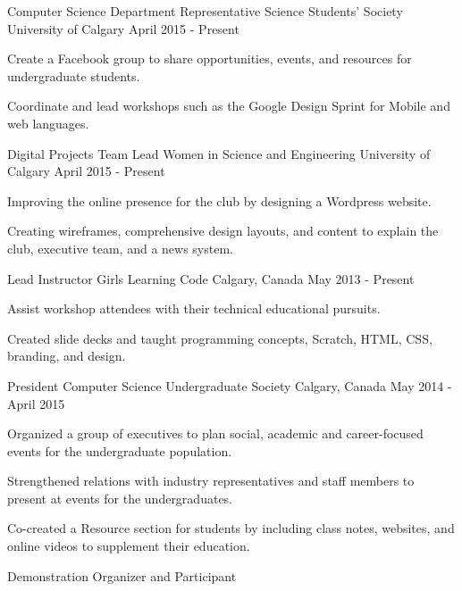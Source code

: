 \begin{cventries}
  \cventry
    {Computer Science Department Representative}
    {Science Students' Society}
    {University of Calgary}
    {April 2015 - Present}
    {
      \begin{cvitems}
        \item {Create a Facebook group to share opportunities, events, and resources for undergraduate students.}
        \item {Coordinate and lead workshops such as the Google Design Sprint for Mobile and web languages.}
      \end{cvitems}
    }
  \cventry
    {Digital Projects Team Lead}
    {Women in Science and Engineering}
    {University of Calgary}
    {April 2015 - Present}
    {
      \begin{cvitems}
        \item {Improving the online presence for the club by designing a Wordpress website.}
        \item {Creating wireframes, comprehensive design layouts, and content to explain the club, executive team, and a news system.}
      \end{cvitems}
    }
  \cventry
    {Lead Instructor}
    {Girls Learning Code}
    {Calgary, Canada}
    {May 2013 - Present}
    {
      \begin{cvitems}
        \item {Assist workshop attendees with their technical educational pursuits.}
        \item {Created slide decks and taught programming concepts, Scratch, HTML, CSS, branding, and design.}
      \end{cvitems}
    }
  \cventry
    {President}
    {Computer Science Undergraduate Society}
    {Calgary, Canada}
    {May 2014 - April 2015}
    {
      \begin{cvitems}
        \item {Organized a group of executives to plan social, academic and career-focused events for the undergraduate population.}
        \item {Strengthened relations with industry representatives and staff members to present at events for the undergraduates.}
        \item {Co-created a Resource section for students by including class notes, websites, and online videos to supplement their education.}
      \end{cvitems}
    }
  \cventry
    {Demonstration Organizer and Participant}

\end{cventries}
